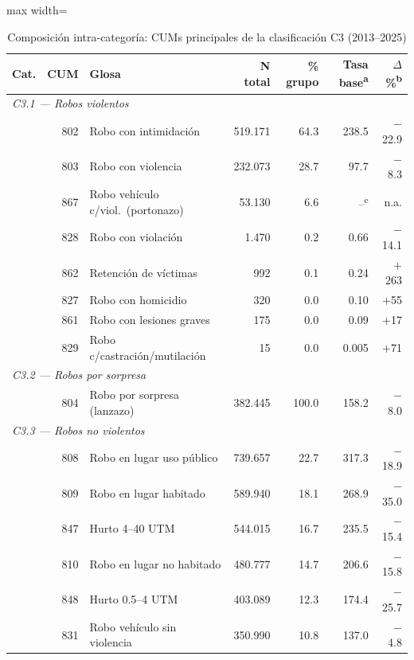 \documentclass[12pt,a4paper]{article}
\begin{document}
\begin{table}[H]
\centering
\caption{Composici\'on intra-categor\'ia: CUMs principales de la clasificaci\'on C3 (2013--2025)}
\label{tab:cum}
\footnotesize
\begin{adjustbox}{max width=\columnwidth}
\begin{tabular}{lrp{5cm}rrrr}
\toprule
\textbf{Cat.} & \textbf{CUM} & \textbf{Glosa} & \textbf{N total} & \textbf{\% grupo} & \textbf{Tasa base\textsuperscript{a}} & \textbf{$\Delta$\%\textsuperscript{b}} \\
\midrule
\multicolumn{7}{l}{\textit{C3.1 --- Robos violentos}} \\
 & 802 & Robo con intimidaci\'on        & 519.171 & 64.3 & 238.5 & $-$22.9 \\
 & 803 & Robo con violencia             & 232.073 & 28.7 &  97.7 & $-$8.3  \\
 & 867 & Robo veh\'iculo c/viol.\ (portonazo) & 53.130 & 6.6 & --\textsuperscript{c} & n.a. \\
 & 828 & Robo con violaci\'on           &   1.470 &  0.2 &  0.66 & $-$14.1 \\
 & 862 & Retenci\'on de v\'ictimas      &     992 &  0.1 &  0.24 & $+$263  \\
 & 827 & Robo con homicidio             &     320 &  0.0 &  0.10 & $+$55   \\
 & 861 & Robo con lesiones graves       &     175 &  0.0 &  0.09 & $+$17   \\
 & 829 & Robo c/castraci\'on/mutilaci\'on &   15  &  0.0 & 0.005 & $+$71   \\
\midrule
\multicolumn{7}{l}{\textit{C3.2 --- Robos por sorpresa}} \\
 & 804 & Robo por sorpresa (lanzazo)   & 382.445 & 100.0 & 158.2 & $-$8.0 \\
\midrule
\multicolumn{7}{l}{\textit{C3.3 --- Robos no violentos}} \\
 & 808 & Robo en lugar uso p\'ublico   & 739.657 & 22.7 & 317.3 & $-$18.9 \\
 & 809 & Robo en lugar habitado        & 589.940 & 18.1 & 268.9 & $-$35.0 \\
 & 847 & Hurto 4--40 UTM               & 544.015 & 16.7 & 235.5 & $-$15.4 \\
 & 810 & Robo en lugar no habitado     & 480.777 & 14.7 & 206.6 & $-$15.8 \\
 & 848 & Hurto 0.5--4 UTM              & 403.089 & 12.3 & 174.4 & $-$25.7 \\
 & 831 & Robo veh\'iculo sin violencia  & 350.990 & 10.8 & 137.0 & $-$4.8  \\

\end{tabular}
\end{adjustbox}
\end{table}
\end{document}

